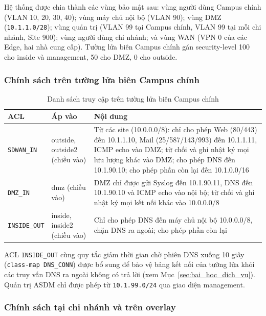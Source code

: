 Hệ thống được chia thành các vùng bảo mật sau: vùng người dùng Campus chính (VLAN 10, 20, 30, 40); vùng máy chủ nội bộ (VLAN 90); vùng DMZ (\texttt{10.1.1.0/28}); vùng quản trị (VLAN 99 tại Campus chính, VLAN 99 tại mỗi chi nhánh, Site 900); vùng người dùng chi nhánh; và vùng WAN (VPN 0 của các Edge, hai nhà cung cấp). Tường lửa biên Campus chính gán security-level 100 cho inside và management, 50 cho DMZ, 0 cho outside.

\subsubsection{Chính sách trên tường lửa biên Campus chính}

\begin{table}[H]
    \centering
    \small
    \caption{Danh sách truy cập trên tường lửa biên Campus chính}
    \label{tab:acl_fw}
    \begin{tabularx}{\textwidth}{|P{2.3cm}|P{2.4cm}|X|}
        \hline
        \textbf{ACL} & \textbf{Áp vào} & \textbf{Nội dung} \\
        \hline
        \texttt{SDWAN\_IN} & outside, outside2 (chiều vào) & Từ các site (10.0.0.0/8): chỉ cho phép Web (80/443) đến 10.1.1.10, Mail (25/587/143/993) đến 10.1.1.11, ICMP echo vào DMZ; từ chối và ghi nhật ký mọi lưu lượng khác vào DMZ; cho phép DNS đến 10.1.90.10; cho phép phần còn lại đến 10.1.0.0/16 \\
        \hline
        \texttt{DMZ\_IN} & dmz (chiều vào) & DMZ chỉ được gửi Syslog đến 10.1.90.11, DNS đến 10.1.90.10 và ICMP echo vào nội bộ; từ chối và ghi nhật ký mọi kết nối khác vào 10.0.0.0/8 \\
        \hline
        \texttt{INSIDE\_OUT} & inside, inside2 (chiều vào) & Chỉ cho phép DNS đến máy chủ nội bộ 10.0.0.0/8, chặn DNS ra ngoài; cho phép phần còn lại \\
        \hline
    \end{tabularx}
\end{table}

ACL \texttt{INSIDE\_OUT} cùng quy tắc giảm thời gian chờ phiên DNS xuống 10 giây (\texttt{class-map DNS\_CONN}) được bổ sung để bảo vệ bảng kết nối của tường lửa khỏi các truy vấn DNS ra ngoài không có trả lời (xem Mục~\ref{sec:bai_hoc_dich_vu}). Quản trị ASDM chỉ được phép từ \texttt{10.1.99.0/24} qua giao diện management.

\subsubsection{Chính sách tại chi nhánh và trên overlay}

